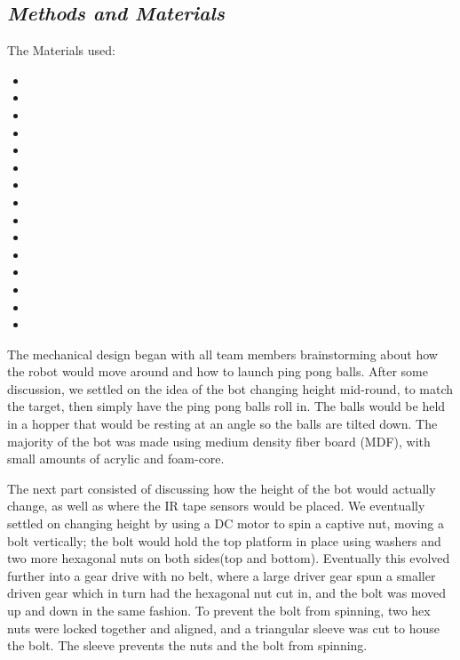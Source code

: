\documentclass[]{article}
\begin{document}
\subsection*{\textit{Methods and Materials}}
The Materials used:
\begin{itemize}
    \item {}
    \item {}
    \item {}
    \item {} 
    \item {}
    \item {}
    \item {}
    \item {}
    \item {}
    \item {}
    \item {}
    \item {}
    \item {}
    \item {}
    \item {}
\end{itemize}

The mechanical design began with all team members brainstorming about how the robot would move around and how to launch ping pong balls. After some discussion, we settled on the idea of the bot changing height mid-round, to match the target, then simply have the ping pong balls roll in. The balls would be held in a hopper that would be resting at an angle so the balls are tilted down. The majority of the bot was made using medium density fiber board (MDF), with small amounts of acrylic and foam-core. 

The next part consisted of discussing how the height of the bot would actually change, as well as where the IR tape sensors would be placed. We eventually settled on changing height by using a DC motor to spin a captive nut, moving a bolt vertically; the bolt would hold the top platform in place using washers and two more hexagonal nuts on both sides(top and bottom). Eventually this evolved further into a gear drive with no belt, where a large driver gear spun a smaller driven gear which in turn had the hexagonal nut cut in, and the bolt was moved up and down in the same fashion. To prevent the bolt from spinning, two hex nuts were locked together and aligned, and a triangular sleeve was cut to house the bolt. The sleeve prevents the nuts and the bolt from spinning.
\end{document}

